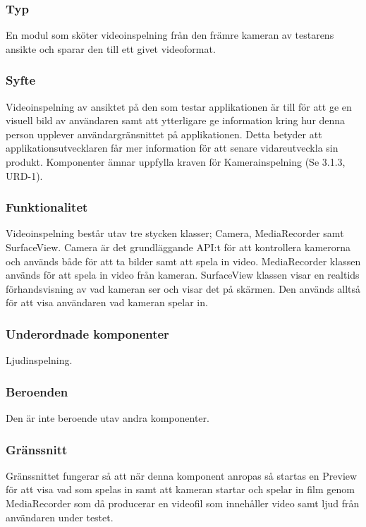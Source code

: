\subsubsection{Typ}
En modul som sköter videoinspelning från den främre kameran av testarens ansikte och sparar den till ett givet videoformat.

\subsubsection{Syfte}
Videoinspelning av ansiktet på den som testar applikationen är till för att ge en visuell bild av användaren samt att ytterligare ge information kring hur denna person upplever användargränsnittet på applikationen. Detta betyder att applikationsutvecklaren får mer information för att senare vidareutveckla sin produkt. Komponenter ämnar uppfylla kraven för Kamerainspelning (Se 3.1.3, URD-1).

\subsubsection{Funktionalitet}
Videoinspelning består utav tre stycken klasser; Camera, MediaRecorder samt SurfaceView. Camera är det grundläggande API:t för att kontrollera kamerorna och används både för att ta bilder samt att spela in video. MediaRecorder klassen används för att spela in video från kameran. SurfaceView klassen visar en realtids förhandsvisning av vad kameran ser och visar det på skärmen. Den används alltså för att visa användaren vad kameran spelar in.

\subsubsection{Underordnade komponenter}
Ljudinspelning.

\subsubsection{Beroenden}
Den är inte beroende utav andra komponenter.

\subsubsection{Gränssnitt}
Gränssnittet fungerar så att när denna komponent anropas så startas en Preview för att visa vad som spelas in samt att kameran startar och spelar in film genom MediaRecorder som då producerar en videofil som innehåller video samt ljud från användaren under testet.


